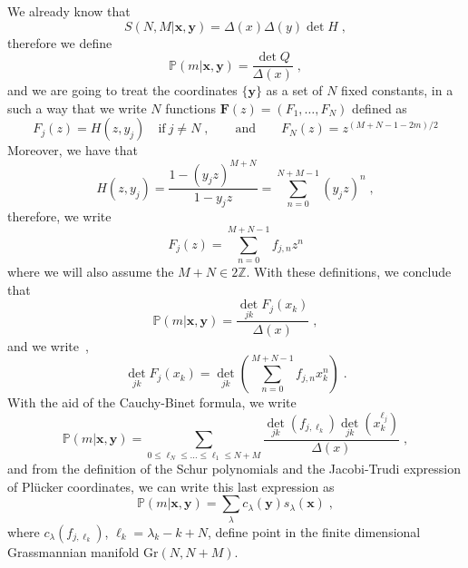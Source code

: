 \documentclass[a4paper,11pt]{amsart}
\begin{document}
We already know that 
\begin{equation}
   S(N,M|\bm{x}, \bm{y}) =  \Delta(x) \Delta(y) \det H \; ,
\end{equation}
therefore we define
\begin{equation}
  \mathbb{P}(m|\bm{x}, \bm{y}) =\frac{\det Q}{\Delta(x)}\; ,
\end{equation}
and we are going to treat the coordinates \(\{ \bm{y} \}\) as
a set of \(N\) fixed constants, in a such a way that we write \(N\)
functions \(\bm{F}(z) = (F_1, \dots, F_N)\) defined as
\begin{equation}
  F_j (z) = H(z, y_j) \quad \textrm{if} \ j \neq N\; , \qquad \textrm{and}\qquad 
   F_N (z)  = z^{(M + N - 1 - 2m)/2} 
\end{equation}
Moreover, we have that
\begin{equation}
  H(z, y_j) = \frac{1 - (y_j z)^{M + N}}{1 - y_j z} = \sum_{n=0}^{N + M - 1} (y_j z)^n\; , 
\end{equation}
therefore, we write
\begin{equation}
  F_j(z) =  \sum_{n=0}^{M + N -1} f_{j, n} z^n
\end{equation}
where we will also assume the \(M + N \in 2 \mathbb{Z}\). With these definitions,
we conclude that
\begin{equation}
  \mathbb{P}(m|\bm{x}, \bm{y}) =\frac{\det_{jk} F_j(x_k)}{\Delta(x)}\; ,
\end{equation}
and we write~\cite{Takasaki:2010qm}, 
\begin{equation}
  \det_{jk} F_j(x_k) = \det_{jk} \left(  \sum_{n=0}^{M + N -1} f_{j, n} x_k^n \right) \; .
\end{equation}
With the aid of the Cauchy-Binet formula, we write  
\begin{equation}
  \mathbb{P}(m|\bm{x}, \bm{y}) = \sum_{0\leq \ell_N\leq \dots \leq \ell_1 \leq N+M}
  \frac{\det_{jk}(f_{j, \ell_k}) \det_{jk}(x_k^{\ell_j})}{\Delta(x)}\; ,
\end{equation}
and from the definition of the Schur polynomials and the
Jacobi-Trudi expression of Plücker coordinates, we can write this last
expression as 
\begin{equation}
  \mathbb{P}(m|\bm{x}, \bm{y}) = \sum_{\lambda} c_\lambda(\bm{y}) s_\lambda(\bm{x}) \; ,
\end{equation}
where \(c_\lambda(f_{j, \ell_k})\),  \(\ell_k = \lambda_k - k +N\), define point
in the finite dimensional Grassmannian manifold \(\mathrm{Gr}(N, N+M)\). 

\end{document}
